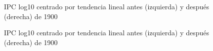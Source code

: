 \documentclass[a4paper]{article}
\begin{document}
\begin{figure}[H]
	\centering
	\caption{IPC log10 centrado por tendencia lineal antes (izquierda) y después (derecha) de 1900} 	
	\label{fig:cpi_log10_cntr}
\end{figure}

\begin{figure}[H]
	\centering
	\caption{IPC log10 centrado por tendencia lineal antes (izquierda) y después (derecha) de 1900} 	
	\label{fig:cpi_log10_cntr_fft}
\end{figure}
\end{document}
